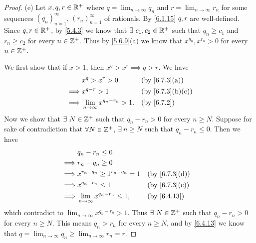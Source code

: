 \begin{proof}{(e)}
  Let \(x, q, r \in \mathbb{R}^+\) where \(q = \lim_{n \to \infty} q_n\) and \(r = \lim_{n \to \infty} r_n\) for some sequences \((q_n)_{n = 1}^\infty\), \((r_n)_{n = 1}^\infty\) of rationals.
  By \cref{6.1.15} \(q, r\) are well-defined.
  Since \(q, r \in \mathbb{R}^+\), by \cref{5.4.3} we know that \(\exists\ c_1, c_2 \in \mathbb{R}^+\) such that \(q_n \geq c_1\) and \(r_n \geq c_2\) for every \(n \in \mathbb{Z}^+\).
  Thus by \cref{5.6.9}(a) we know that \(x^{q_n}, x^{r_n} > 0\) for every \(n \in \mathbb{Z}^+\).

  We first show that if \(x > 1\), then \(x^q > x^r \implies q > r\).
  We have
  \begin{align*}
             & x^q > x^r > 0                          &  & \text{(by \cref{6.7.3}(a))}    \\
    \implies & x^{q - r} > 1                          &  & \text{(by \cref{6.7.3}(b)(c))} \\
    \implies & \lim_{n \to \infty} x^{q_n - r_n} > 1. &  & \text{(by \cref{6.7.2})}       \\
  \end{align*}
  Now we show that \(\exists\ N \in \mathbb{Z}^+\) such that \(q_n - r_n > 0\) for every \(n \geq N\).
  Suppose for sake of contradiction that \(\forall N \in \mathbb{Z}^+\), \(\exists\ n \geq N\) such that \(q_n - r_n \leq 0\).
  Then we have
  \begin{align*}
             & q_n - r_n \leq 0                                                           \\
    \implies & r_n - q_n \geq 0                                                           \\
    \implies & x^{r_n - q_n} \geq 1^{r_n - q_n} = 1      &  & \text{(by \cref{6.7.3}(d))} \\
    \implies & x^{q_n - r_n} \leq 1                      &  & \text{(by \cref{6.7.3}(c))} \\
    \implies & \lim_{n \to \infty} x^{q_n - r_n} \leq 1, &  & \text{(by \cref{6.4.13})}
  \end{align*}
  which contradict to \(\lim_{n \to \infty} x^{q_n - r_n} > 1\).
  Thus \(\exists\ N \in \mathbb{Z}^+\) such that \(q_n - r_n > 0\) for every \(n \geq N\).
  This means \(q_n > r_n\) for every \(n \geq N\), and by \cref{6.4.13} we know that \(q = \lim_{n \to \infty} q_n \geq \lim_{n \to \infty} r_n = r\).


\end{proof}

